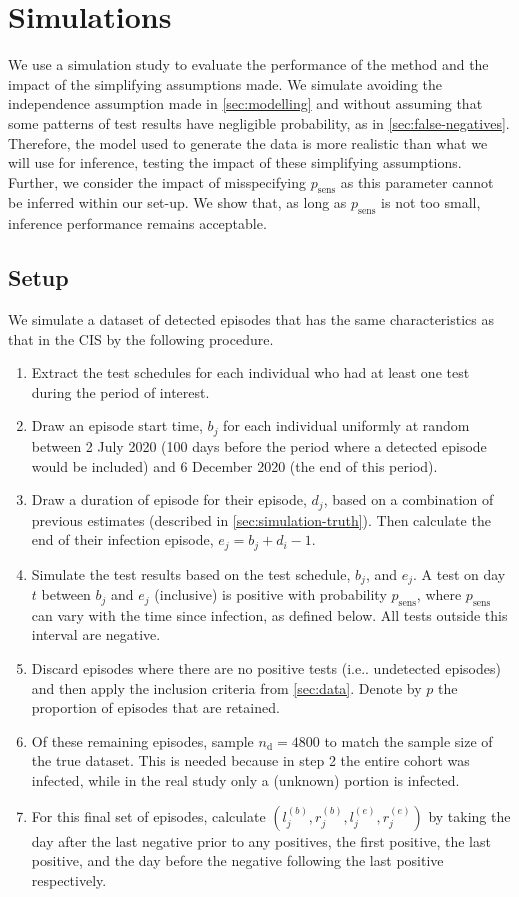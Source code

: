 \documentclass[12pt]{article}
\makeatletter
\newcommand{\psens}{p_\text{sens}}
\newcommand{\ndet}{n_\text{d}}
\DeclareRobustCommand\onedot{\futurelet\@let@token\@onedot}
\def\@onedot{\ifx\@let@token.\else.\null\fi\xspace}
\def\ie{i.e\onedot} \def\Ie{{I.e}\onedot}
\makeatother
\begin{document}
\section{Simulations} \label{sec:simulation}


We use a simulation study to evaluate the performance of the method and the impact of the simplifying assumptions made.
We simulate avoiding the independence assumption made in \cref{sec:modelling} and without assuming that some patterns of test results have negligible probability, as in \cref{sec:false-negatives}.
Therefore, the model used to generate the data is more realistic than what we will use for inference, testing the impact of these simplifying assumptions.
Further, we consider the impact of misspecifying $\psens$ as this parameter cannot be inferred within our set-up.
We show that, as long as $\psens$ is not too small, inference performance remains acceptable.

\subsection{Setup}

We simulate a dataset of detected episodes that has the same characteristics as that in the CIS by the following procedure.
\begin{enumerate}
    \item Extract the test schedules for each individual who had at least one test during the period of interest.
    \item Draw an episode start time, $b_{j}$ for each individual uniformly at random between 2 July 2020 (100 days before the period where a detected episode would be included) and 6 December 2020 (the end of this period).
    \item Draw a duration of episode for their episode, $d_j$, based on a combination of previous estimates (described in \cref{sec:simulation-truth}). Then calculate the end of their infection episode, $e_{j} = b_{j} + d_i - 1$.
    \item Simulate the test results based on the test schedule, $b_{j}$, and $e_{j}$. A test on day $t$ between $b_{j}$ and $e_{j}$ (inclusive) is positive with probability $\psens$, where $\psens$ can vary with the time since infection, as defined below. All tests outside this interval are negative.
    \item Discard episodes where there are no positive tests (\ie undetected episodes) and then apply the inclusion criteria from \cref{sec:data}. Denote by $p$ the proportion of episodes that are retained.
    \item Of these remaining episodes, sample $\ndet = 4800$ to match the sample size of the true dataset. This is needed because in step 2 the entire cohort was infected, while in the real study only a (unknown) portion is infected.
    \item For this final set of episodes, calculate $(l_j^{(b)}, r_j^{(b)}, l_j^{(e)}, r_j^{(e)})$ by taking the day after the last negative prior to any positives, the first positive, the last positive, and the day before the negative following the last positive respectively.
\end{enumerate}
\end{document}

